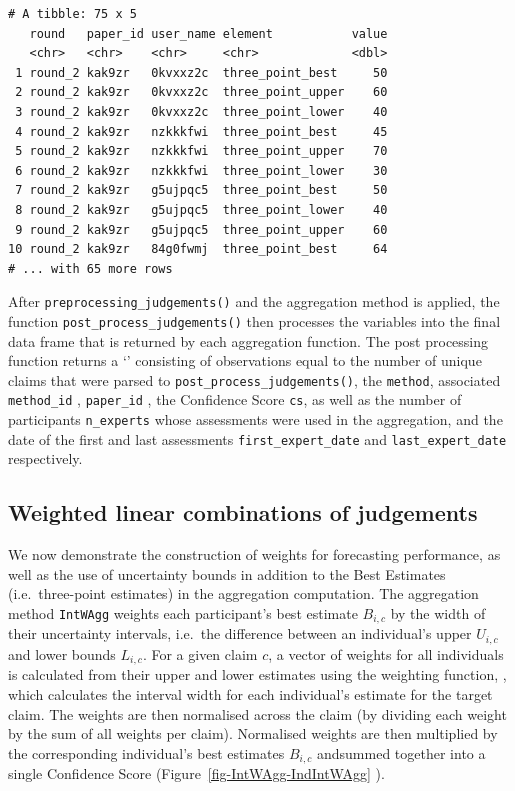 \documentclass[article]{jss}
\newcommand{\class}[1]{`\code{#1}'}
\newcommand{\fct}[1]{\code{#1()}}
\begin{document}
\begin{tcolorbox}[enhanced jigsaw, left=2mm, opacityback=0, leftrule=.75mm, colback=white, colframe=quarto-callout-color-frame, arc=.35mm, rightrule=.15mm, breakable, bottomrule=.15mm, toprule=.15mm]
\begin{verbatim}
# A tibble: 75 x 5
   round   paper_id user_name element           value
   <chr>   <chr>    <chr>     <chr>             <dbl>
 1 round_2 kak9zr   0kvxxz2c  three_point_best     50
 2 round_2 kak9zr   0kvxxz2c  three_point_upper    60
 3 round_2 kak9zr   0kvxxz2c  three_point_lower    40
 4 round_2 kak9zr   nzkkkfwi  three_point_best     45
 5 round_2 kak9zr   nzkkkfwi  three_point_upper    70
 6 round_2 kak9zr   nzkkkfwi  three_point_lower    30
 7 round_2 kak9zr   g5ujpqc5  three_point_best     50
 8 round_2 kak9zr   g5ujpqc5  three_point_lower    40
 9 round_2 kak9zr   g5ujpqc5  three_point_upper    60
10 round_2 kak9zr   84g0fwmj  three_point_best     64
# ... with 65 more rows
\end{verbatim}

After \texttt{preprocessing\_judgements()} and the aggregation method is
applied, the function \texttt{post\_process\_judgements()} then
processes the variables into the final data frame that is returned by
each aggregation function. The post processing function returns a
\class{tibble} consisting of observations equal to the number of unique
claims that were parsed to \texttt{post\_process\_judgements()}, the
\texttt{method}, associated \texttt{method\_id} , \texttt{paper\_id} ,
the Confidence Score \texttt{cs}, as well as the number of participants
\texttt{n\_experts} whose assessments were used in the aggregation, and
the date of the first and last assessments \texttt{first\_expert\_date}
and \texttt{last\_expert\_date} respectively.

\end{tcolorbox}

\hypertarget{sec-IntWAgg}{%
\subsection{Weighted linear combinations of
judgements}\label{sec-IntWAgg}}

We now demonstrate the construction of weights for forecasting
performance, as well as the use of uncertainty bounds in addition to the
Best Estimates (i.e.~three-point estimates) in the aggregation
computation. The aggregation method \texttt{IntWAgg} weights each
participant's best estimate \(B_{i,c}\) by the width of their
uncertainty intervals, i.e.~the difference between an individual's upper
\({U}_{i,c}\) and lower bounds \({L}_{i,c}\). For a given claim \(c\), a
vector of weights for all individuals is calculated from their upper and
lower estimates using the weighting function, \fct{weight\_interval},
which calculates the interval width for each individual's estimate for
the target claim. The weights are then normalised across the claim (by
dividing each weight by the sum of all weights per claim). Normalised
weights are then multiplied by the corresponding individual's best
estimates \(B_{i,c}\) andsummed together into a single Confidence Score
(Figure~\ref{fig-IntWAgg-IndIntWAgg} ).
\end{document}
